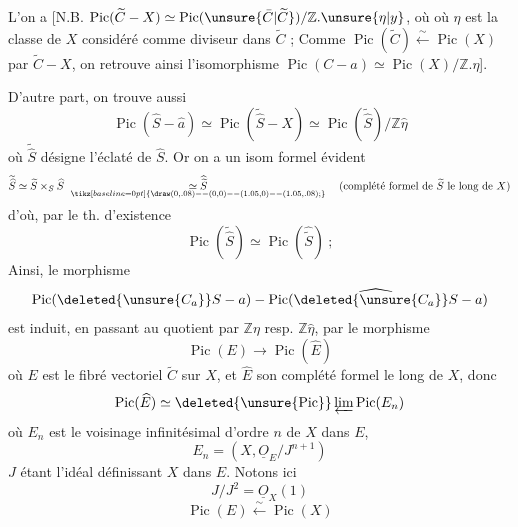 L'on a 
[N.B. $\operatorname{Pic}(\widetilde C-X)\simeq\operatorname{Pic}(\unsure{\bar C|\widetilde C})/\mathbb Z.\unsure{\eta|y}$, où où $\eta$ est la classe de $X$ considéré comme diviseur dans $\widetilde C$ ;  Comme $\operatorname{Pic}(\widetilde C)\xleftarrow{\sim}\operatorname{Pic}(X)$ par $\widetilde C\mathbin{-}X$, on retrouve ainsi l'isomorphisme $\operatorname{Pic}(C-a)\simeq\operatorname{Pic}(X)/\mathbb Z.\eta$].

D'autre part, on trouve aussi
\[
\operatorname{Pic}(\widehat S-\hat a)\simeq\operatorname{Pic}(\widetilde{\widehat S}-X)\simeq\operatorname{Pic}(\widetilde{\widehat S})/\mathbb Z\hat\eta
\]
où $\widetilde{\widehat S}$ désigne l'éclaté de $\widehat S$. Or on a un isom formel évident
\[
\widetilde{\widehat S}\simeq\widetilde S\times_S\widehat S\ \underset{\smash{\tikz[baseline=0pt]{\draw (0,.08)--(0,0)--(1.05,0)--(1.05,.08);}}}{\simeq\widehat{\widetilde S}}
\quad\text{(complété formel de $\widetilde S$ le long de $X$)}
\]
d'où, par le th. d'existence
\[
\operatorname{Pic}(\widetilde{\widehat S})\simeq\operatorname{Pic}(\widehat{\widetilde S})\ ;
\]
 Ainsi, le  morphisme
\[
\operatorname{Pic}(\deleted{\unsure{C_a}}S-a)\mathbin{-}\operatorname{Pic}(\widehat{\deleted{\unsure{C_a}}S}-a)
\]
est induit, en passant au quotient par $\mathbb Z\eta$ resp. $\mathbb Z\hat\eta$, par le morphisme
\[
\operatorname{Pic}(E)\longrightarrow\operatorname{Pic}(\widehat E)
\]
où $E$ est le fibré vectoriel $\widetilde C$ sur $X$, et $\widehat E$ son complété formel le long de $X$, donc
\[
\operatorname{Pic}(\widehat E)\simeq\deleted{\unsure{\operatorname{Pic}}}\varprojlim\operatorname{Pic}(E_n)
\]
où $E_n$ est le voisinage infinitésimal d'ordre $n$ de $X$ dans $E$,
\[
E_n=(X,\underline O_E/J^{n+1})
\]
$J$ étant l'idéal définissant $X$ dans $E$. Notons ici
\[
J/J^2=\underline O_X(1)
\]
\[
\operatorname{Pic}(E)\xleftarrow{\sim}\operatorname{Pic}(X)
\]

